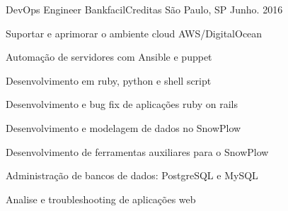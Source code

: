 

\begin{cventries}

  \cventry
    {DevOps Engineer} %
    {Bankfacil\/Creditas} %
    {São Paulo, SP} %
    {Junho. 2016} %
    {
      \begin{cvitems} %
        \item {Suportar e aprimorar o ambiente cloud AWS/DigitalOcean}
        \item {Automação de servidores com Ansible e puppet}
	\item {Desenvolvimento em ruby, python e shell script}
	\item {Desenvolvimento e bug fix de aplicações ruby on rails}
	\item {Desenvolvimento e modelagem de dados no SnowPlow}
	\item {Desenvolvimento de ferramentas auxiliares para o SnowPlow}
	\item {Administração de bancos de dados: PostgreSQL e MySQL}
        \item {Analise e troubleshooting de aplicações web}
      \end{cvitems}
    }


\end{cventries}
